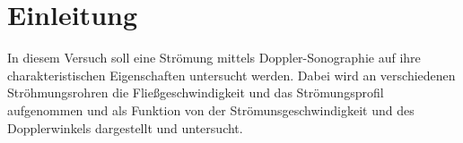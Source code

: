 \section{Einleitung}
\label{sec:einleitung}
In diesem Versuch soll eine Strömung mittels Doppler-Sonographie auf ihre
charakteristischen Eigenschaften untersucht werden. Dabei wird an verschiedenen
Ströhmungsrohren die Fließgeschwindigkeit und das Strömungsprofil aufgenommen und
als Funktion von der Strömunsgeschwindigkeit und des Dopplerwinkels dargestellt
und untersucht.
